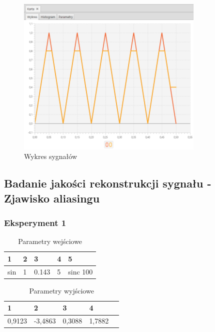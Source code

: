\documentclass[12pt]{article}
\begin{document}
{{{                \begin{figure}[H]
                    \centering
                    \includegraphics[width=0.8\textwidth]{img/result/experiment2/09/data_draw_original_chart_recon_output_130459.png}
                    \caption{Wykres sygnałów}
                \end{figure}
            }
            \newpage


        }

        \subsection{Badanie jakości rekonstrukcji sygnału - Zjawisko aliasingu} {

            \subsubsection{Eksperyment 1} {
                \begin{table}[H]
                    \centering
                    \begin{tabular}{|l|l|l|l|l|}
                        \hline
                        1 & 2 & 3 & 4 & 5   \\ \hline
                        sin & 1 & 0.143 & 5 & sinc 100   \\ \hline
                    \end{tabular}
                    \caption{Parametry wejściowe}
                \end{table}

                \begin{table}[H]
                    \centering
                    \begin{tabular}{|l|l|l|l|l|}
                        \hline
                        1 & 2 & 3 & 4   \\ \hline
                        0,9123 & -3,4863 & 0,3088 & 1,7882 \\ \hline
                    \end{tabular}
                    \caption{Parametry wyjściowe}
                \end{table}


}}}
\end{document}
